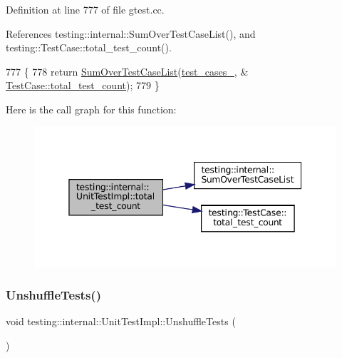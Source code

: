 Definition at line 777 of file gtest.\+cc.



References testing\+::internal\+::\+Sum\+Over\+Test\+Case\+List(), and testing\+::\+Test\+Case\+::total\+\_\+test\+\_\+count().


\begin{DoxyCode}
777                                          \{
778   \textcolor{keywordflow}{return} \hyperlink{namespacetesting_1_1internal_a564f9e608c608736ebe2199ab831745b}{SumOverTestCaseList}(\hyperlink{classtesting_1_1internal_1_1UnitTestImpl_a79ec0f733ada2898efd1a7fbd8587fb3}{test\_cases\_}, &
      \hyperlink{classtesting_1_1TestCase_aba3cab19aaf7295284f0832f2cf895a3}{TestCase::total\_test\_count});
779 \}
\end{DoxyCode}
Here is the call graph for this function\+:
\nopagebreak
\begin{figure}[H]
\begin{center}
\leavevmode
\includegraphics[width=345pt]{classtesting_1_1internal_1_1UnitTestImpl_a89e8531ee2ba3f0aadc27a95ac6149f1_cgraph}
\end{center}
\end{figure}
\mbox{\label{classtesting_1_1internal_1_1UnitTestImpl_a1ee7db3bf8284dd9dce4dc857564bce3}} 
\subsubsection{\texorpdfstring{Unshuffle\+Tests()}{UnshuffleTests()}}
{\footnotesize\ttfamily void testing\+::internal\+::\+Unit\+Test\+Impl\+::\+Unshuffle\+Tests (\begin{DoxyParamCaption}{ }\end{DoxyParamCaption})}



